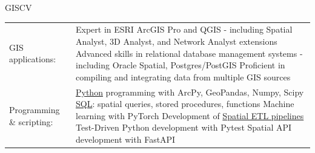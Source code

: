 \documentclass[letterpaper]{article}
\newenvironment{skillslist}
        {
            \hspace*{-0.07in}\begin{tabular}[t]{ l L{5.17in} }
        }{
            \end{tabular}
        }
\newcommand{\impt}[1]{\uline{#1}}
\begin{document}
    \begin{taggedblock}{GISCV}
        \begin{skillslist}
            GIS applications:&
                Expert in ESRI ArcGIS Pro and QGIS \linebreak
                - including Spatial Analyst, 3D Analyst, and Network Analyst extensions \linebreak
                Advanced skills in relational database management systems \linebreak
                - including Oracle Spatial, Postgres/PostGIS \linebreak
                Proficient in compiling and integrating data from multiple GIS sources \linebreak
                \\
            Programming \& scripting:&
                \impt{Python} programming with ArcPy, GeoPandas, Numpy, Scipy\linebreak
                \impt{SQL}: spatial queries, stored procedures, functions \linebreak
                Machine learning with PyTorch \linebreak
                Development of \impt{Spatial ETL pipelines} \linebreak
                Test-Driven Python development with Pytest \linebreak
                Spatial API development with FastAPI \linebreak
                \\

\end{skillslist}
\end{taggedblock}
\end{document}
